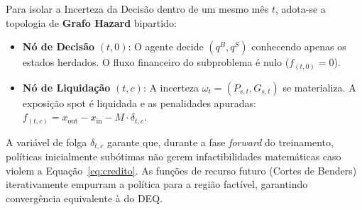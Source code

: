 Para isolar a Incerteza da Decisão dentro de um mesmo mês $t$, adota-se a topologia de \textbf{Grafo Hazard} bipartido:
\begin{itemize}
    \item \textbf{Nó de Decisão} $(t, 0)$: O agente decide $(q^B, q^S)$ conhecendo apenas os estados herdados. O fluxo financeiro do subproblema é nulo ($f_{(t,0)} = 0$).
    \item \textbf{Nó de Liquidação} $(t, c)$: A incerteza $\omega_t = (P_{s,t}, G_{s,t})$ se materializa. A exposição spot é liquidada e as penalidades apuradas: $f_{(t,c)} = x_{\text{out}} - x_{\text{in}} - M \cdot \delta_{t,c}$.
\end{itemize}

A variável de folga $\delta_{t,c}$ garante que, durante a fase \textit{forward} do treinamento, políticas inicialmente subótimas não gerem infactibilidades matemáticas caso violem a Equação~\ref{eq:credito}. As funções de recurso futuro (Cortes de Benders) iterativamente empurram a política para a região factível, garantindo convergência equivalente à do DEQ.